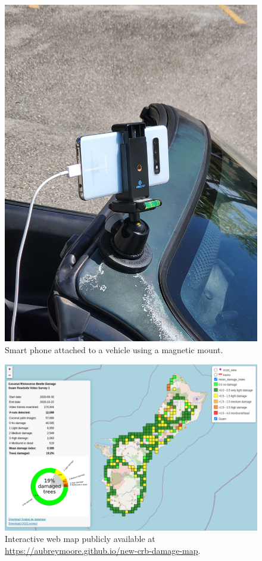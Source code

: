 \documentclass[letterpaper, 11pt]{scrartcl}
\begin{document}
\begin{figure}
	\centering
	\includegraphics[width=0.9\linewidth]{images/car.jpg}
	\caption{Smart phone attached to a vehicle using a magnetic mount.}
	\label{fig:mount}
\end{figure}

\begin{figure}
	\centering
	\includegraphics[width=\linewidth]{images/webmap1.png}
	\caption{Interactive web map publicly available at \url{https://aubreymoore.github.io/new-crb-damage-map}.}
	\label{fig:webmap}
\end{figure}
\end{document}
